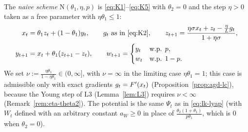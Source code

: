 \begin{definition}\label{def:naive}
The \emph{naive scheme} $\mathrm{N}(\theta_1,\eta,p)$ is \eqref{eq:K1}--\eqref{eq:K5} with $\theta_2=0$ and the step $\eta>0$ taken as a free parameter with $\eta\theta_1\le1$:
\begin{equation}\label{eq:naive}
\begin{aligned}
x_t&=\theta_1z_t+(1-\theta_1)y_t,\qquad g_t\text{ as in \eqref{eq:K2}},\qquad z_{t+1}=\frac{\eta\sigma x_t+z_t-\frac\eta Lg_t}{1+\eta\sigma},\\
y_{t+1}&=x_t+\theta_1(z_{t+1}-z_t),\qquad w_{t+1}=\begin{cases}y_t&\text{w.p. }p,\\ w_t&\text{w.p. }1-p.\end{cases}
\end{aligned}
\end{equation}
We set $\nu:=\frac{\eta\theta_1}{1-\eta\theta_1}\in(0,\infty]$, with $\nu=\infty$ in the limiting case $\eta\theta_1=1$; this case is admissible only with exact gradients $g_t=F'(x_t)$ (Proposition~\ref{prop:agd-lc}), because the Young step of L3 (Lemma~\ref{lem:L3}) requires $\nu<\infty$ (Remark~\ref{rem:eta-theta2}). The potential is the same $\Psi_t$ as in \eqref{eq:lk-lyap} (with $W_t$ defined with an arbitrary constant $a_W\ge0$ in place of $\frac{\theta_2(1+\theta_1)}{p\theta_1}$, which is $0$ when $\theta_2=0$).
\end{definition}

